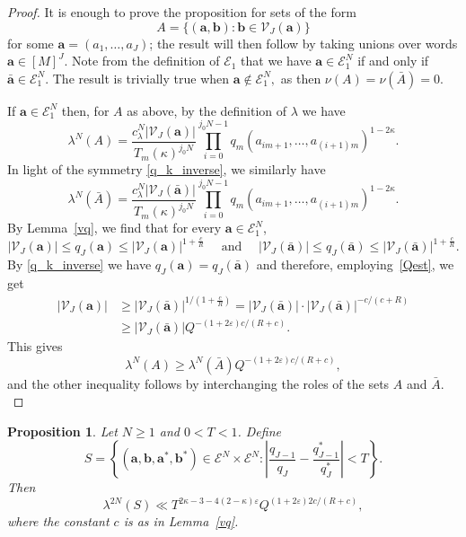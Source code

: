 \documentclass[12pt, reqno]{amsart}
\newtheorem{prop}[thm]{Proposition}
\theoremstyle{definition}
\theoremstyle{remark}
\numberwithin{equation}{section}
\def\kap{{\kappa}}
\def\lam{{\lambda}} \def\Lam{{\Lambda}} \def\Lamtil{{\widetilde \Lambda}}
\def\ls{\leqslant} \def\gs{\geqslant}
\def\leq{\leqslant}
\def \ba {\mathbf a}
\def \bb {\mathbf b}
\def \cE {\mathcal E}
\def \cV {\mathcal V}
\begin{document}
\begin{proof} It is enough to prove the proposition for sets of the form  
\[
A=\{(\ba,\bb): \bb \in \cV_{J}(\ba)\}
\]
for some $\ba=(a_1,\ldots,a_{J})$; the result will then follow  by taking unions over words $\ba \in [M]^{J}$.
Note from the definition of $\cE_1$ that we have $\ba \in \cE_1^N$ if and only if $\bar{\ba}\in \cE_1^N.$ The result is trivially true when $\ba\notin \cE_1^N,$ as then $\nu(A) = \nu(\bar{A})=0.$ 

If $\ba\in \cE_1^N$ then, for $A$ as above, by the definition of $\lam$ we have 
\[
\lam^N(A) = \frac{c_{\lambda}^N |\cV_{J}(\ba)|}{T_m(\kappa)^{j_0 N}}\prod_{i=0}^{j_0 N-1}q_m\left(a_{im+1},\dots, a_{(i+1)m}\right)^{1-2\kappa}.        
\]
In light of the symmetry \eqref{q_k_inverse}, we similarly have
\[
\lam^N(\bar{A}) = \frac{c_{\lambda}^N |\cV_{J}(\bar{\ba})|}{T_m(\kappa)^{j_0 N}}\prod_{i=0}^{j_0 N-1}q_m\left(a_{im+1},\dots, a_{(i+1)m}\right)^{1-2\kappa}.        
\]
By Lemma~\ref{vq}, we find that for every $\ba\in\cE_1^N$,
\[ |\cV_{J}(\ba)|\leq q_{J}(\ba) \ls |\cV_{J}(\ba)|^{1+\frac{c}{R}} \quad \text{ and } \quad |\cV_{J}(\bar{\ba})| \leq q_{J}(\bar{\ba}) \leq |\cV_{J}(\bar{\ba})|^{1+\frac{c}{R}}. \] 
By  \eqref{q_k_inverse} we have $q_{J}(\ba) = q_{J}(\bar{\ba})$ and therefore,  employing~\eqref{Qest}, we get
\[
\begin{aligned}
|\cV_{J}(\ba)| &\gs |\cV_{J}(\bar{\ba})|^{1/(1+\frac{c}{R})} = |\cV_J(\bar{\ba})| \cdot |\cV_{J}(\bar{\ba})|^{-c/(c+R)}\\ &\gs |\cV_{J}(\bar{\ba})| Q^{-(1+2\varepsilon)c/(R+c)}.\end{aligned} 
\]
This gives
\[ 
\lam^N(A) \gs 
\lam^N(\bar{A}) 
Q^{-(1+2\varepsilon)
c/(R+c)},
\]
and the other inequality follows by interchanging the roles of the sets $A$ and $\bar{A}.$ 
\end{proof}

\begin{prop} \label{prop_close_ratios}
Let $N\gs 1$  and $0<T<1$. Define
\[
S = \left\{ (\ba,\bb,\ba^*,\bb^*)\in \cE^N \times \cE^N :  \left|\frac{q_{J-1}}{q_J}-\frac{q_{J-1}^*}{q_J^*}\right|<T \right\}.
\]
Then
\[
\lam^{2N}(S) \ll 
T^{2\kappa-3-4(2-\kap)\varepsilon}
Q^{(1+2\varepsilon)2c/(R+c)},
\]
where the constant $c$ is as in Lemma~\ref{vq}. 
\end{prop}
\end{document}
